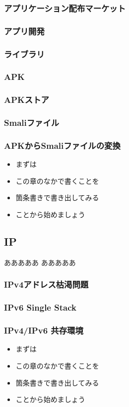 \documentclass[a4j]{jarticle}
\begin{document}
\subsubsection{アプリケーション配布マーケット}
\subsubsection{アプリ開発}
\subsubsection{ライブラリ}
\subsubsection{APK}
\subsubsection{APKストア}
\subsubsection{Smaliファイル}
\subsubsection{APKからSmaliファイルの変換}
\begin{itemize}
\item まずは
\item この章のなかで書くことを
\item 箇条書きで書き出してみる
\item ことから始めましょう
\end{itemize}

\subsection{IP}
あああああ
あああああ
\subsubsection{IPv4アドレス枯渇問題}
\subsubsection{IPv6 Single Stack}
\subsubsection{IPv4/IPv6 共存環境}
\begin{itemize}
\item まずは
\item この章のなかで書くことを
\item 箇条書きで書き出してみる
\item ことから始めましょう
\end{itemize}
\end{document}
